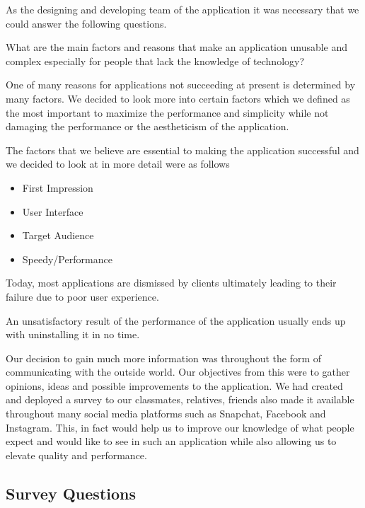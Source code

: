 \documentclass[a4paper,12pt]{report}
\begin{document}
As the designing and developing team of the application it was necessary that we could answer the following questions.

What are the main factors and reasons that make an application unusable and complex especially for people that lack the knowledge of technology?

One of many reasons for applications not succeeding at present is determined by many factors. We decided to look more into certain factors which we defined as the most important to maximize the performance and simplicity while not damaging the performance or the aestheticism of the application. 
\cite{DesignFailure}

The factors that we believe are essential to making the application successful and we decided to look at in more detail were as follows

\begin{itemize}
    \item First Impression
    \item User Interface
    \item Target Audience
    \item Speedy/Performance
\end{itemize}

Today, most applications are dismissed by clients ultimately leading to their failure due to poor user experience.

An unsatisfactory result of the performance of the application usually ends up with uninstalling it in no time. 
\cite{AppFailure}


Our decision to gain much more information was throughout the form of communicating with the outside world. Our objectives from this were to gather opinions, ideas and possible improvements to the application.
We had created and deployed a survey to our classmates, relatives, friends also made it available throughout many social media platforms such as Snapchat, Facebook and Instagram. 
This, in fact would help us to improve our knowledge of what people expect and would like to see in such an application while also allowing us to elevate quality and performance.\cite{surveyReasearch}

\subsection{Survey Questions}
\end{document}
